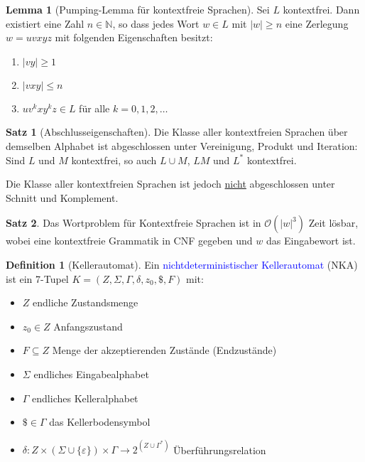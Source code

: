 \documentclass{scrreprt}
\theoremstyle{definition}
\newtheorem{Definition}{Definition}[section]
\newtheorem{Satz}{Satz}[section]
\newtheorem{Lemma}{Lemma}[section]
\theoremstyle{example}
\theoremstyle{algorithm}
\begin{document}
\begin{Lemma}[Pumping-Lemma für kontextfreie Sprachen]
Sei $L$ kontextfrei. Dann existiert eine Zahl $n \in \mathbb{N}$, so dass jedes Wort $w \in L$ mit $|w| \geq n$ eine Zerlegung $w=uvxyz$ mit folgenden Eigenschaften besitzt:
\begin{enumerate}
\item
$|vy|\geq 1$
\item
$|vxy| \leq n$
\item
$uv^kxy^kz \in L$ für alle $k=0,1,2,\ldots$
\end{enumerate}
\end{Lemma}

\begin{Satz}[Abschlusseigenschaften]
Die Klasse aller kontextfreien Sprachen über demselben Alphabet ist abgeschlossen unter Vereinigung, Produkt und Iteration: Sind $L$ und $M$ kontextfrei, so auch $L \cup M$, $LM$ und $L^*$ kontextfrei.\par
Die Klasse aller kontextfreien Sprachen ist jedoch \underline{nicht} abgeschlossen unter Schnitt und Komplement.
\end{Satz}

\begin{Satz}
Das Wortproblem für Kontextfreie Sprachen ist in $\mathcal{O}(|w|^3)$ Zeit lösbar, wobei eine kontextfreie Grammatik in CNF gegeben und $w$ das Eingabewort ist.
\end{Satz}

\begin{Definition}[Kellerautomat]
Ein \textcolor{blue}{nichtdeterministischer Kellerautomat} (NKA) ist ein 7-Tupel $K=(Z,\Sigma,\Gamma,\delta,z_0,\$,F)$ mit:
\begin{itemize}
\item
$Z$ endliche Zustandsmenge
\item
$z_0 \in Z$ Anfangszustand
\item
$F\subseteq Z$ Menge der akzeptierenden Zustände (Endzustände)
\item
$\Sigma$ endliches Eingabealphabet
\item
$\Gamma$ endliches Kelleralphabet
\item
$\$\in\Gamma$ das Kellerbodensymbol
\item
$\delta : Z \times (\Sigma\cup\{\varepsilon\}) \times \Gamma \rightarrow 2^{(Z\cup\Gamma^*)}$ Überführungsrelation
\end{itemize}
\end{Definition}
\end{document}
